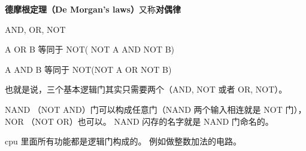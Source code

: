 
\begin{issues}
\issueDraft
\end{issues}

\textbf{德摩根定理（De Morgan's laws）}又称\textbf{对偶律}

AND, OR, NOT

A OR B 等同于 NOT( NOT A AND NOT B)

A AND B 等同于 NOT(NOT A OR NOT B)

也就是说，三个基本逻辑门其实只需要两个（AND, NOT 或者 OR, NOT）。

NAND （NOT AND）门可以构成任意门（NAND 两个输入相连就是 NOT 门）， NOR （NOT OR）也可以。 NAND 闪存的名字就是 NAND 门命名的。

cpu 里面所有功能都是逻辑门构成的。 例如做整数加法的电路。
